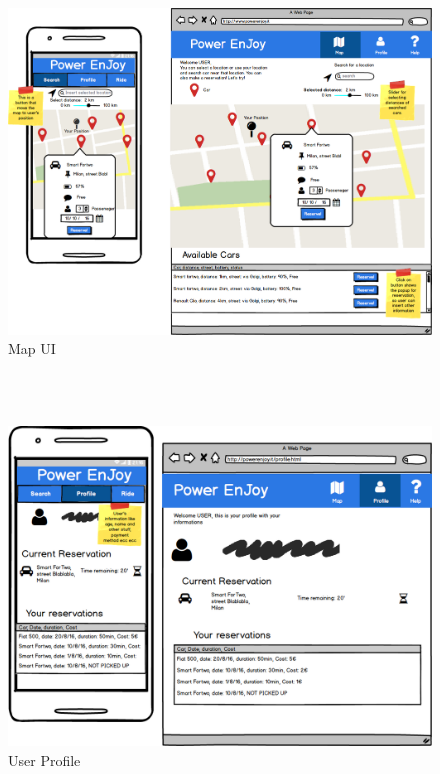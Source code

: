 \begin{center}
\begin{figure}[H]
\includegraphics[scale=0.15]{Mockup/Map}

\caption{Map UI}
\end{figure}
\\
\\
\begin{figure}[H]

\includegraphics[scale=0.3]{Mockup/Profile}

\caption{User Profile}
\end{figure}
\\
\\
\begin{figure}[H]


\end{figure}
\end{center}
